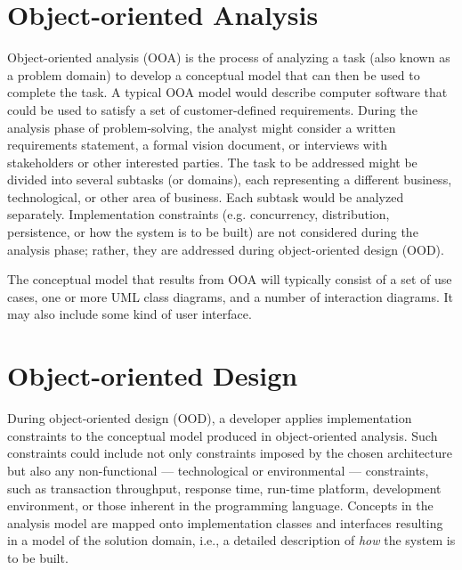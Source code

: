 \documentclass [11pt]{book}
\begin{document}
\section{Object-oriented Analysis}

\label{sec:object-orientedanalysis}



Object-oriented analysis (OOA) is the process of analyzing
       a task (also known as a problem domain) to develop a conceptual
       model that can then be used to complete the task. A typical OOA
       model would describe computer software that could be used to
       satisfy a set of customer-defined requirements. During the
       analysis phase of problem-solving, the analyst might consider a
       written requirements statement, a formal vision document, or
       interviews with stakeholders or other interested parties. The
       task to be addressed might be divided into several subtasks (or
       domains), each representing a different business,
       technological, or other area of business. Each subtask would be
       analyzed separately. Implementation
       constraints (e.g. concurrency, distribution, persistence, or
       how the system is to be built) are not considered during the
       analysis phase; rather, they are addressed during
       object-oriented design (OOD).



The conceptual model that results from OOA will typically consist of a
set of use cases, one or more UML class diagrams, and a number of
interaction diagrams. It may also include some kind of user interface.



\section{Object-oriented Design}

\label{sec:object-orienteddesign}

During object-oriented design (OOD), a developer applies implementation constraints
to the conceptual model produced in object-oriented analysis. Such constraints could include
not only constraints imposed by the chosen architecture but also any non-functional --- 
technological or environmental --- constraints, such as transaction throughput, response time,
run-time platform, development environment, or those inherent in the programming language. Concepts
in the analysis model are mapped onto implementation classes and interfaces resulting in
a model of the solution domain, i.e., a detailed description of \emph{how} the system is to be built.
\end{document}
